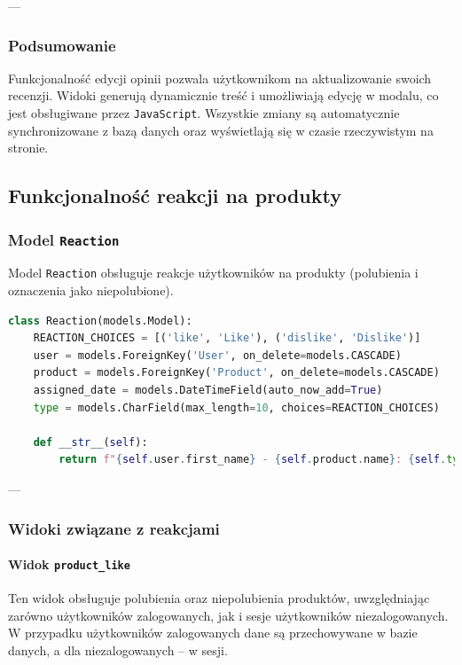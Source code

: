 \documentclass[12pt,a4paper,oneside]{article}
\theoremstyle{definition}
\numberwithin{equation}{section}
\begin{document}
---

\subsubsection{Podsumowanie}
Funkcjonalność edycji opinii pozwala użytkownikom na aktualizowanie swoich recenzji. Widoki generują dynamicznie treść i umożliwiają edycję w modalu, co jest obsługiwane przez \texttt{JavaScript}. Wszystkie zmiany są automatycznie synchronizowane z bazą danych oraz wyświetlają się w czasie rzeczywistym na stronie.

% 
% 

\subsection{Funkcjonalność reakcji na produkty}

\subsubsection{Model \texttt{Reaction}}
Model \texttt{Reaction} obsługuje reakcje użytkowników na produkty (polubienia i oznaczenia jako niepolubione). 

\begin{lstlisting}[language=Python, caption=Model \texttt{Reaction}]
class Reaction(models.Model):
    REACTION_CHOICES = [('like', 'Like'), ('dislike', 'Dislike')]
    user = models.ForeignKey('User', on_delete=models.CASCADE)
    product = models.ForeignKey('Product', on_delete=models.CASCADE)
    assigned_date = models.DateTimeField(auto_now_add=True)
    type = models.CharField(max_length=10, choices=REACTION_CHOICES)

    def __str__(self):
        return f"{self.user.first_name} - {self.product.name}: {self.type}"
\end{lstlisting}

---

\subsubsection{Widoki związane z reakcjami}

\paragraph{Widok \texttt{product\_like}}
Ten widok obsługuje polubienia oraz niepolubienia produktów, uwzględniając zarówno użytkowników zalogowanych, jak i sesje użytkowników niezalogowanych. W przypadku użytkowników zalogowanych dane są przechowywane w bazie danych, a dla niezalogowanych – w sesji.
\end{document}
